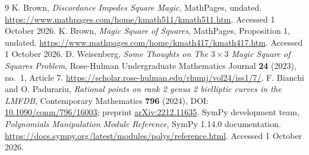 \documentclass[11pt]{article}
\theoremstyle{definition}\newtheorem{definition}[theorem]{Definition}
\theoremstyle{remark}\newtheorem{remark}[theorem]{Remark}
\begin{document}
\begin{thebibliography}{9}
 K. Brown, \emph{Discordance Impedes Square Magic}, MathPages, undated. \url{https://www.mathpages.com/home/kmath511/kmath511.htm}. Accessed 1 October 2026.
 K. Brown, \emph{Magic Square of Squares}, MathPages, Proposition 1, undated. \url{https://www.mathpages.com/home/kmath417/kmath417.htm}. Accessed 1 October 2026.
 D. Weisenberg, \emph{Some Thoughts on The $3\times3$ Magic Square of Squares Problem}, Rose-Hulman Undergraduate Mathematics Journal \textbf{24} (2023), no.~1, Article 7. \url{https://scholar.rose-hulman.edu/rhumj/vol24/iss1/7/}.
 F. Bianchi and O. Padurariu, \emph{Rational points on rank 2 genus 2 bielliptic curves in the LMFDB}, Contemporary Mathematics \textbf{796} (2024), DOI: \href{https://doi.org/10.1090/conm/796/16003}{10.1090/conm/796/16003}; preprint \href{https://arxiv.org/abs/2212.11635}{arXiv:2212.11635}.
 SymPy development team, \emph{Polynomials Manipulation Module Reference}, SymPy 1.14.0 documentation. \url{https://docs.sympy.org/latest/modules/polys/reference.html}. Accessed 1 October 2026.
\end{thebibliography}
\end{document}
